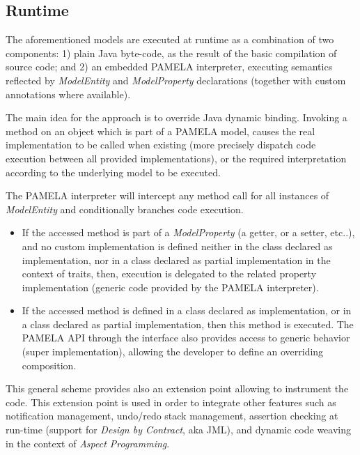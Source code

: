  \subsection{Runtime}
 \label{sub:RunTime}
 
 The aforementioned models are executed at runtime as a combination of two components: 1) plain Java byte-code, as the result of the basic compilation of source code; and 2) an embedded PAMELA interpreter, executing semantics reflected by \emph{ModelEntity} and \emph{ModelProperty}  declarations (together with custom annotations where available).

The main idea for the approach is to override Java dynamic binding. Invoking a method on an object which is part of a PAMELA model, causes the real implementation to be called when existing (more precisely dispatch code execution between all provided implementations), or the required interpretation according to the underlying model to be executed. 
 
The PAMELA interpreter will intercept any method call for all instances of \emph{ModelEntity} and conditionally branches code execution.
 \begin{itemize}
     \item If the accessed method is part of a \emph{ModelProperty} (a getter, or a setter, etc..), and no custom implementation is defined neither in the class declared as implementation, nor in a class declared as partial implementation in the context of traits, then, execution is delegated to the related property implementation (generic code provided by the PAMELA interpreter).
     \item If the accessed method is defined in a class declared as implementation, or in a class declared as partial implementation, then this method is executed. The PAMELA API through the  interface also provides access to generic behavior (super implementation), allowing the developer to define an overriding composition.
 \end{itemize}
 
This general scheme provides also an extension point allowing to instrument the code. This extension point is used in order to integrate other features such as notification management, undo/redo stack management, assertion checking at run-time (support for \emph{Design by Contract}, aka JML), and dynamic code weaving in the context of \emph{Aspect Programming}.

